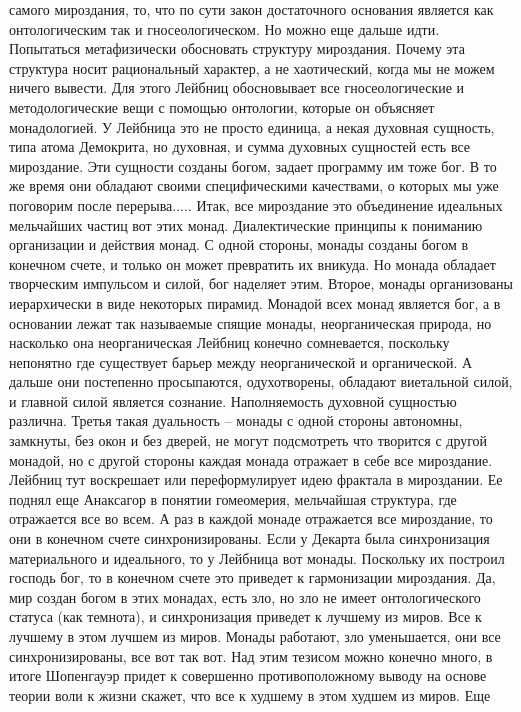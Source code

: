 \documentclass[a4paper, 12pt]{article}
\begin{document}
самого мироздания, то, что по сути закон достаточного основания является 
как онтологическим так и гносеологическом. Но можно еще дальше идти. 
Попытаться метафизически обосновать структуру мироздания. Почему эта 
структура носит рациональный характер, а не хаотический, когда мы не 
можем ничего вывести. Для этого Лейбниц обосновывает все 
гносеологические и методологические вещи с помощью онтологии, которые он 
объясняет монадологией. У Лейбница это не просто единица, а некая 
духовная сущность, типа атома Демокрита, но духовная, и сумма духовных 
сущностей есть все мироздание. Эти сущности созданы богом, задает 
программу им тоже бог. В то же время они обладают своими специфическими 
качествами, о которых мы уже поговорим после перерыва..... Итак, все 
мироздание это объединение идеальных мельчайших частиц вот этих монад. 
Диалектические принципы к пониманию организации и действия монад. 
С одной стороны, монады созданы богом в конечном счете, и только он 
может превратить их вникуда. Но монада обладает творческим импульсом 
и силой, бог наделяет этим. Второе, монады организованы иерархически 
в виде некоторых пирамид. Монадой всех монад является бог, а в основании 
лежат так называемые спящие монады, неорганическая природа, но насколько 
она неорганическая Лейбниц конечно сомневается, поскольку непонятно где 
существует барьер между неорганической и органической. А дальше они 
постепенно просыпаются, одухотворены, обладают виетальной силой, 
и главной силой является сознание. Наполняемость духовной сущностью 
различна. Третья такая дуальность -- монады с одной стороны автономны, 
замкнуты, без окон и без дверей, не могут подсмотреть что творится 
с другой монадой, но с другой стороны каждая монада отражает в себе все 
мироздание. Лейбниц тут воскрешает или переформулирует идею фрактала 
в мироздании. Ее поднял еще Анаксагор в понятии гомеомерия, мельчайшая 
структура, где отражается все во всем. А раз в каждой монаде отражается 
все мироздание, то они в конечном счете синхронизированы. Если у Декарта 
была синхронизация материального и идеального, то у Лейбница вот монады. 
Поскольку их построил господь бог, то в конечном счете это приведет 
к гармонизации мироздания. Да, мир создан богом в этих монадах, есть 
зло, но зло не имеет онтологического статуса (как темнота), 
и синхронизация приведет к лучшему из миров. Все к лучшему в этом лучшем 
из миров. Монады работают, зло уменьшается, они все синхронизированы, 
все вот так вот. Над этим тезисом можно конечно много, в итоге 
Шопенгауэр придет к совершенно противоположному выводу на основе теории 
воли к жизни скажет, что все к худшему в этом худшем из миров. Еще 
\end{document}
